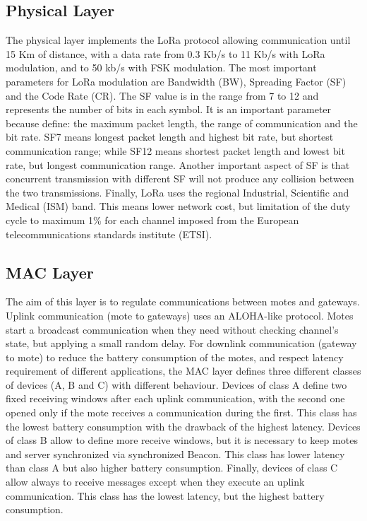 \subsection{Physical Layer}
The physical layer implements the LoRa protocol allowing communication until 15 Km of distance, with a data rate from 0.3 Kb/s to 11 Kb/s with LoRa modulation, and to 50 kb/s with FSK modulation.
% 
The most important parameters for LoRa modulation are Bandwidth (BW), Spreading Factor (SF) and the Code Rate (CR).
% 
The SF value is in the range from 7 to 12 and represents the number of bits in each symbol.
% 
It is an important parameter because define: the maximum packet length, the range of communication and the bit rate.
% 
SF7 means longest packet length and highest bit rate, but shortest communication range; while SF12 means shortest packet length and lowest bit rate, but longest communication range.
% 
Another important aspect of SF is that concurrent transmission with different SF will not produce any collision between the two transmissions.
% 
Finally, LoRa uses the regional Industrial, Scientific and Medical (ISM) band. This means lower network cost, but limitation of the duty \mbox{cycle} to maximum 1\% for each channel imposed from the European telecommunications standards institute (ETSI).

\subsection{MAC Layer}
The aim of this layer is to regulate communications between motes and gateways.
% 
Uplink communication (mote to gateways) uses an ALOHA-like protocol. Motes start a broadcast communication when they need without checking channel's state, but applying a small random delay.
% 
For downlink communication (gateway to mote) to reduce the battery consumption of the motes, and respect latency requirement of different applications, the MAC layer defines three different classes of devices (A, B and C) with different behaviour.
% 
Devices of class A define two fixed receiving windows after each uplink communication, with the second one opened only if the mote receives a communication during the first. 
% 
This class has the lowest battery consumption with the drawback of the highest latency. 
% 
Devices of class B allow to define more receive windows, but it is necessary to keep motes and server synchronized via synchronized Beacon. 
% 
This class has lower latency than class A but also higher battery consumption. 
% 
Finally, devices of class C allow always to receive messages except when they execute an uplink communication. 
% 
This class has the lowest latency, but the highest battery consumption.

